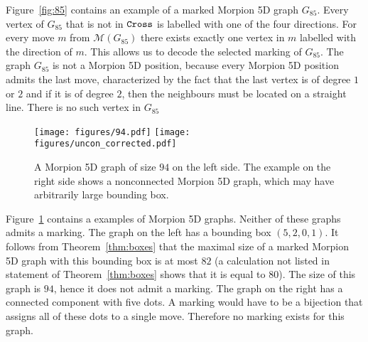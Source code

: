 Figure~\ref{fig:85} contains an example of a marked Morpion 5D graph $G_{85}$. 
Every vertex of $G_{85}$ that is not in $\texttt{Cross}$ is labelled with one of the four directions. 
For every move $m$ from $\mathcal{M}(G_{85})$ there exists exactly one vertex in $m$ 
  labelled with the direction of $m$.
This allows us to decode the selected marking of $G_{85}$.
The graph $G_{85}$ is not a Morpion 5D position,  because every Morpion 5D position admits the last move, characterized by the fact that the last vertex is of degree $1$ or $2$ and if it is
of degree $2$, then the neighbours must be located on a straight line. 
There is no such vertex in $G_{85}$

\begin{figure}
  \centering
    \texttt{[image: figures/94.pdf]}
    \texttt{[image: figures/uncon\_corrected.pdf]}
  \caption{
    A Morpion 5D graph of size $94$ on the left side. 
    The example on the right side shows a nonconnected Morpion 5D graph,
      which may have arbitrarily large bounding box.
  }
  \label{fig:uncon}
\end{figure}

Figure~\ref{fig:uncon} contains a examples of Morpion 5D graphs.
Neither of these graphs admits a marking.
The graph on the left has a bounding box $(5,2,0,1)$.
It follows from Theorem~\ref{thm:boxes} that the maximal size of a marked Morpion 5D graph with this 
  bounding box is at most $82$ (a calculation not listed in statement of Theorem~\ref{thm:boxes} shows that it is equal to $80$).
The size of this graph is $94$, hence it does not admit a marking.
The graph on the right has a connected component with five dots.
A marking would have to be a bijection that assigns all of these dots to a single move.
Therefore no marking exists for this graph.

